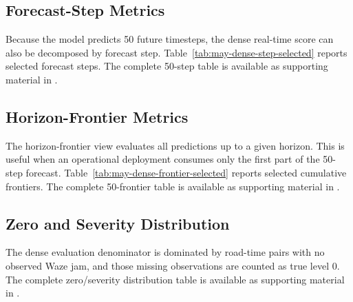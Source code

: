 \documentclass[11pt, a4paper]{article}
\begin{document}
\subsection{Forecast-Step Metrics}

Because the model predicts 50 future timesteps, the dense real-time score can also be decomposed by forecast step. Table~\ref{tab:may-dense-step-selected} reports selected forecast steps. The complete 50-step table is available as supporting material in .

\begin{table}[htbp]
\centering
\caption{Selected dense real-time metrics by forecast step. Complete 50-step data are available in \texttt{may\_dense\_step\_metrics\_all.csv}.}
\label{tab:may-dense-step-selected}
{%
%
}
\end{table}

\subsection{Horizon-Frontier Metrics}

The horizon-frontier view evaluates all predictions up to a given horizon. This is useful when an operational deployment consumes only the first part of the 50-step forecast. Table~\ref{tab:may-dense-frontier-selected} reports selected cumulative frontiers. The complete 50-frontier table is available as supporting material in .

\begin{table}[htbp]
\centering
\caption{Selected cumulative dense metrics by horizon frontier. Complete data are available in \texttt{may\_dense\_horizon\_frontier\_all.csv}.}
\label{tab:may-dense-frontier-selected}
{%
%
}
\end{table}

\subsection{Zero and Severity Distribution}

The dense evaluation denominator is dominated by road-time pairs with no observed Waze jam, and those missing observations are counted as true level 0. The complete zero/severity distribution table is available as supporting material in .
\end{document}
